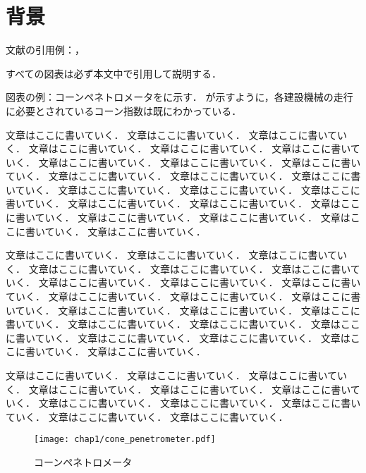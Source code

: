 \documentclass[../main]{subfiles}
\begin{document}
\section{背景}
\label{sec:intro_background}
文献の引用例：\cite{cao2014main1-1-4-3}，\cite{Kiribayashi2018}

すべての図表は必ず本文中で引用して説明する．

図表の例：コーンペネトロメータをに示す．
が示すように，各建設機械の走行に必要とされているコーン指数は既にわかっている．

文章はここに書いていく．
文章はここに書いていく．
文章はここに書いていく．
文章はここに書いていく．
文章はここに書いていく．
文章はここに書いていく．
文章はここに書いていく．
文章はここに書いていく．
文章はここに書いていく．
文章はここに書いていく．
文章はここに書いていく．
文章はここに書いていく．
文章はここに書いていく．
文章はここに書いていく．
文章はここに書いていく．
文章はここに書いていく．
文章はここに書いていく．
文章はここに書いていく．
文章はここに書いていく．
文章はここに書いていく．
文章はここに書いていく．
文章はここに書いていく．

文章はここに書いていく．
文章はここに書いていく．
文章はここに書いていく．
文章はここに書いていく．
文章はここに書いていく．
文章はここに書いていく．
文章はここに書いていく．
文章はここに書いていく．
文章はここに書いていく．
文章はここに書いていく．
文章はここに書いていく．
文章はここに書いていく．
文章はここに書いていく．
文章はここに書いていく．
文章はここに書いていく．
文章はここに書いていく．
文章はここに書いていく．
文章はここに書いていく．
文章はここに書いていく．
文章はここに書いていく．
文章はここに書いていく．
文章はここに書いていく．

文章はここに書いていく．
文章はここに書いていく．
文章はここに書いていく．
文章はここに書いていく．
文章はここに書いていく．
文章はここに書いていく．
文章はここに書いていく．
文章はここに書いていく．
文章はここに書いていく．
文章はここに書いていく．
文章はここに書いていく．


\begin{figure}[t]
  \centering
  \texttt{[image: chap1/cone\_penetrometer.pdf]}
  \caption{コーンペネトロメータ}
  \label{fig:cone_penetrometer}
\end{figure}
\end{document}
